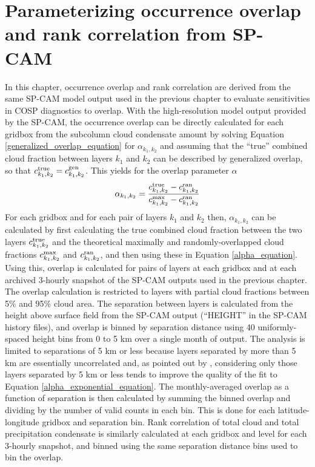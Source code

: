 \section{Parameterizing occurrence overlap and rank correlation from SP-CAM}
\label{subgrid2_overlap_section}
In this chapter, occurrence overlap and rank correlation are derived from the same SP-CAM model output used in the previous chapter to evaluate sensitivities in COSP diagnostics to overlap. With the high-resolution model output provided by the SP-CAM, the occurrence overlap can be directly calculated for each gridbox from the subcolumn cloud condensate  amount by solving Equation \ref{generalized_overlap_equation} for $\alpha_{k_1, k_2}$ and assuming that the ``true'' combined cloud fraction between layers $k_1$ and $k_2$ can be described by generalized overlap, so that $c^{\rm true}_{k_1, k_2} = c^{\rm gen}_{k_1, k_2}$. This yields for the overlap parameter $\alpha$
\begin{gather}
    \alpha_{k_1, k_2} = \frac{
        c^{\rm true}_{k_1, k_2} - c^{\rm ran}_{k_1, k_2}
    }{
        c^{\rm max}_{k_1, k_2} - c^{\rm ran}_{k_1, k_2}
    }
    \label{alpha_equation}
\end{gather}
For each gridbox and for each pair of layers $k_1$ and $k_2$ then, $\alpha_{k_1, k_2}$ can be calculated by first calculating the true combined cloud fraction between the two layers $c^{\rm true}_{k_1, k_2}$ and the theoretical maximally and randomly-overlapped cloud fractions $c^{\rm max}_{k_1, k_2}$ and $c^{\rm ran}_{k_1, k_2}$, and then using these in Equation \ref{alpha_equation}. Using this, overlap is calculated for pairs of layers at each gridbox and at each archived 3-hourly snapshot of the SP-CAM outputs used in the previous chapter. The overlap calculation is restricted to layers with partial cloud fractions between 5\% and 95\% cloud area. The separation between layers is calculated from the height above surface field from the SP-CAM output (``HEIGHT'' in the SP-CAM history files), and overlap is binned by separation distance using 40 uniformly-spaced height bins from 0 to 5 km over a single month of output. The analysis is limited to separations of 5 km or less because layers separated by more than 5 km are essentially uncorrelated and, as pointed out by \cite{pincus_et_al_2005}, considering only those layers separated by 5 km or less tends to improve the quality of the fit to Equation \ref{alpha_exponential_equation}. The monthly-averaged overlap as a function of separation is then calculated by summing the binned overlap and dividing by the number of valid counts in each bin. This is done for each latitude-longitude gridbox and separation bin. Rank correlation of total cloud and total precipitation condensate is similarly calculated at each gridbox and level for each 3-hourly snapshot, and binned using the same separation distance bins used to bin the overlap. 

